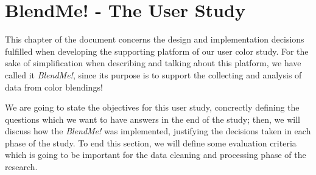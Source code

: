 
\chapter{BlendMe! - The User Study}
\label{chapter:design}
%
This chapter of the document concerns the design and implementation decisions fulfilled when developing the
supporting platform of our user color study. For the sake of simplification when describing and talking about
this platform, we have called it \emph{BlendMe!}, since its purpose is to support the collecting and analysis
of data from color blendings! \par
%
We are going to state the objectives for this user study, concrectly defining the questions which we want to
have answers in the end of the study; then, we will discuss how the \emph{BlendMe!} was implemented, justifying
the decisions taken in each phase of the study. To end this section, we will define some evaluation criteria which
is going to be important for the data cleaning and processing phase of the research.
%
